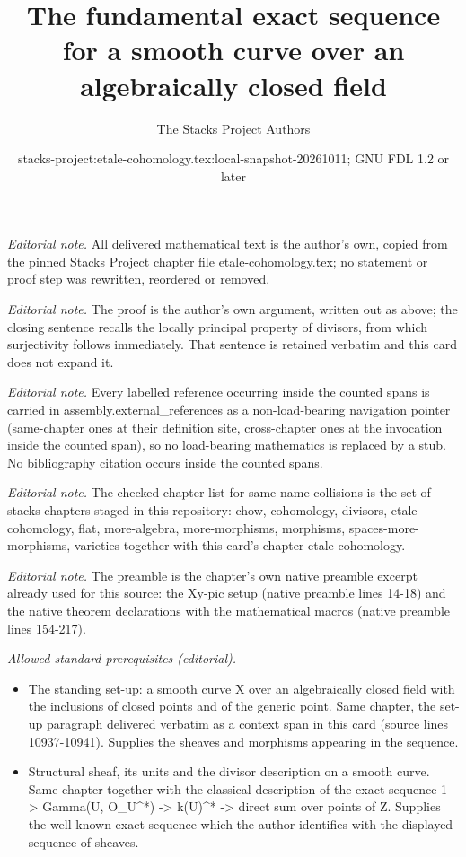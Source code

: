 \documentclass[10pt,a4paper]{amsart}
\title{The fundamental exact sequence for a smooth curve over an algebraically closed field}
\author{The Stacks Project Authors}
\date{stacks-project:etale-cohomology.tex:local-snapshot-20261011; GNU FDL 1.2 or later}
\theoremstyle{plain}
\theoremstyle{definition}
\theoremstyle{remark}
\numberwithin{equation}{subsection}
\begin{document}
\maketitle
\noindent\textit{Editorial note.} All delivered mathematical text is the author's own, copied from the pinned Stacks Project chapter file etale-cohomology.tex; no statement or proof step was rewritten, reordered or removed.\par\medskip
\noindent\textit{Editorial note.} The proof is the author's own argument, written out as above; the closing sentence recalls the locally principal property of divisors, from which surjectivity follows immediately. That sentence is retained verbatim and this card does not expand it.\par\medskip
\noindent\textit{Editorial note.} Every labelled reference occurring inside the counted spans is carried in assembly.external\_references as a non-load-bearing navigation pointer (same-chapter ones at their definition site, cross-chapter ones at the invocation inside the counted span), so no load-bearing mathematics is replaced by a stub. No bibliography citation occurs inside the counted spans.\par\medskip
\noindent\textit{Editorial note.} The checked chapter list for same-name collisions is the set of stacks chapters staged in this repository: chow, cohomology, divisors, etale-cohomology, flat, more-algebra, more-morphisms, morphisms, spaces-more-morphisms, varieties together with this card's chapter etale-cohomology.\par\medskip
\noindent\textit{Editorial note.} The preamble is the chapter's own native preamble excerpt already used for this source: the Xy-pic setup (native preamble lines 14-18) and the native theorem declarations with the mathematical macros (native preamble lines 154-217).\par\medskip
\noindent\textit{Allowed standard prerequisites (editorial).}\begin{itemize}
\item The standing set-up: a smooth curve X over an algebraically closed field with the inclusions of closed points and of the generic point. Same chapter, the set-up paragraph delivered verbatim as a context span in this card (source lines 10937-10941). Supplies the sheaves and morphisms appearing in the sequence.
\item Structural sheaf, its units and the divisor description on a smooth curve. Same chapter together with the classical description of the exact sequence 1 -> Gamma(U, O\_U\textasciicircum{}*) -> k(U)\textasciicircum{}* -> direct sum over points of Z. Supplies the well known exact sequence which the author identifies with the displayed sequence of sheaves.
\end{itemize}\medskip
\end{document}
